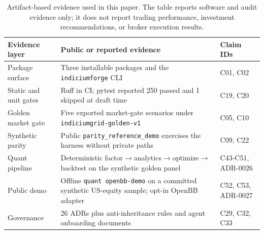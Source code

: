 \documentclass[11pt]{article}
\newcommand{\schema}[1]{\texttt{#1}}
\begin{document}
\begin{table}[t]
\centering
\small
\begin{tabularx}{\linewidth}{lYl}
\toprule
Evidence layer & Public or reported evidence & Claim IDs \\
\midrule
Package surface & Three installable packages and the \texttt{indiciumforge} CLI & C01, C02 \\
Static and unit gates & Ruff in CI; pytest reported 250 passed and 1 skipped at draft time & C19, C20 \\
Golden market gate & Five exported market-gate scenarios under \schema{indiciumgrid-golden-v1} & C05, C10 \\
Synthetic parity & Public \texttt{parity\_reference\_demo} exercises the harness without private paths & C09, C22 \\
Quant pipeline & Deterministic factor$\to$analytics$\to$optimize$\to$backtest on the synthetic golden panel & C43-C51, ADR-0026 \\
Public demo & Offline \texttt{quant openbb-demo} on a committed synthetic US-equity sample; opt-in OpenBB adapter & C52, C53, ADR-0027 \\
Governance & 26 ADRs plus anti-inheritance rules and agent onboarding documents & C29, C32, C33 \\
\bottomrule
\end{tabularx}
\caption{Artifact-based evidence used in this paper. The table reports software and
audit evidence only; it does not report trading performance, investment recommendations, or
broker execution results.}
\label{tab:evidence}
\end{table}
\end{document}
